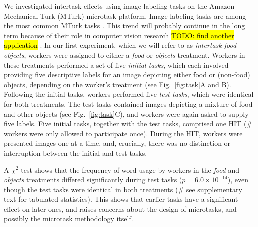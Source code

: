 \documentclass[12pt]{article}
\newcommand{\td}[1]{{\color{blu}\hl{TODO: #1}}}
\begin{document}
We investigated intertask effects using image-labeling tasks on the Amazon 
Mechanical Turk (MTurk) microtask platform.  Image-labeling tasks are among
the most common MTurk tasks \cite{chandler2013breaking,Berinsky2012351,Finnerty2013,paolacci2010running}.  This trend will probably continue 
in the long term because of their role in computer vision research 
\td{find another application} \cite{5543192}.  In our first experiment, 
which we will refer to as 
\textit{intertask-food-objects}, workers were assigned to either a
\textit{food} or \textit{objects} treatment.  Workers in these treatments
performed a set of five \textit{initial tasks}, which each involved 
providing five descriptive labels for an image depicting 
either food or (non-food) objects, depending on the worker's 
treatment (see Fig.~\ref{fig:task}A and B).  Following the initial 
tasks, workers performed five \textit{test tasks}, which were identical for 
both treatments.  The test tasks contained images depicting a 
mixture of food and other objects (see Fig.~\ref{fig:task}C), and workers
were again asked to supply five labels.  Five initial 
tasks, together with the test tasks, comprised one HIT 
(\# workers were only allowed to participate once). During the HIT, workers 
were presented images one at a time, and, crucially, there was no distinction
or interruption between the initial and test tasks.

A $\chi^2$ test shows that the frequency of word usage by
workers in the \textit{food} and \textit{objects} treatments differed
significantly during test tasks ($p = 6.0 \times 10^{-14}$), even though the test tasks were identical 
in both treatments (\# see supplementary text for tabulated statistics).  This shows that earlier tasks have a 
significant effect on later ones, and raises concerns about the 
design of microtasks, and possibly the microtask methodology itself.
\end{document}
